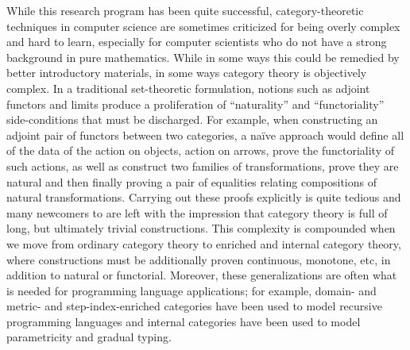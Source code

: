 \documentclass{llncs}
\begin{document}
While this research program has been quite successful,
category-theoretic techniques in computer science are sometimes
criticized for being overly complex and hard to learn, especially for
computer scientists who do not have a strong background in pure
mathematics.
%
While in some ways this could be remedied by better introductory
materials, in some ways category theory is objectively complex.
%
In a traditional set-theoretic formulation, notions such as adjoint
functors and limits produce a proliferation of ``naturality'' and
``functoriality'' side-conditions that must be discharged.
%
For example, when constructing an adjoint pair of
functors between two categories, a na\"ive approach would define all of
the data of the action on objects, action on arrows, prove the
functoriality of such actions, as well as construct two families of
transformations, prove they are natural and then finally proving a pair
of equalities relating compositions of natural transformations.
%
Carrying out these proofs explicitly is quite tedious and many newcomers
to are left with the impression that category theory is full of long,
but ultimately trivial constructions.
%
This complexity is compounded when we move from ordinary category theory to
enriched and internal category theory, where constructions must be
additionally proven continuous, monotone, etc, in addition to natural
or functorial.
%
Moreover, these generalizations are often what is needed for programming
language applications; for example, domain- and metric- and
step-index-enriched categories have been used to model recursive
programming languages and internal categories have been used to model
parametricity and gradual
typing\cite{order-enriched-cats,topos-of-trees,reflexive-graphs,double-cats-gradual-typing}.
\end{document}
